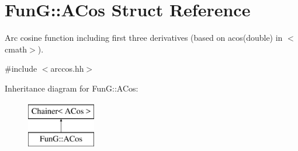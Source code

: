\hypertarget{structFunG_1_1ACos}{}\section{FunG\+:\+:A\+Cos Struct Reference}
\label{structFunG_1_1ACos}


Arc cosine function including first three derivatives (based on acos(double) in $<$cmath$>$).  




{\ttfamily \#include $<$arccos.\+hh$>$}

Inheritance diagram for FunG\+:\+:A\+Cos\+:\begin{figure}[H]
\begin{center}
\leavevmode
\includegraphics[height=2.000000cm]{structFunG_1_1ACos}
\end{center}
\end{figure}
